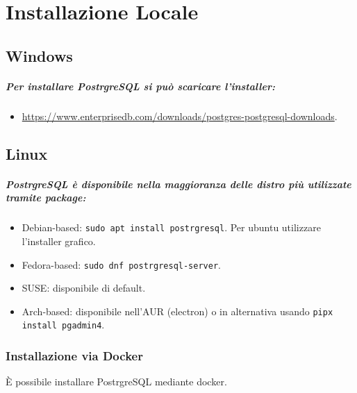 \chapter{Installazione Locale}

\section{Windows}

\paragraph{Per installare PostrgreSQL si può scaricare l'installer:}

\begin{itemize}
  \item \href{https://www.enterprisedb.com/downloads/postgres-postgresql-downloads}{https://www.enterprisedb.com/downloads/postgres-postgresql-downloads}.
\end{itemize}


\section{Linux}

\paragraph{PostrgreSQL è disponibile nella maggioranza delle distro più utilizzate tramite package:}

\begin{itemize}
  \item Debian-based: \texttt{sudo apt install postrgresql}. Per ubuntu utilizzare l'installer grafico.
  \item Fedora-based: \texttt{sudo dnf postrgresql-server}. 
  \item SUSE: disponibile di default. 
  \item Arch-based: disponibile nell'AUR (electron) o in alternativa usando \texttt{pipx install pgadmin4}.
\end{itemize}


\subsection{Installazione via Docker}

È possibile installare PostrgreSQL mediante docker. 


